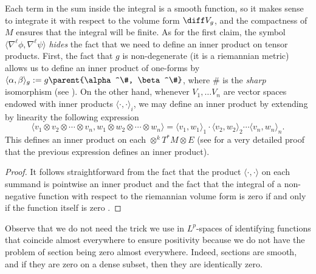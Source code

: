 \begin{obs}
    Each term in the sum inside the integral is a smooth function, so it makes sense to integrate it with respect to the volume form \(\diff V_g\), and the compactness of \(M\) ensures that the integral will be finite. As for the first claim, the symbol \(\langle \nabla^\ell \phi, \nabla^\ell\psi \rangle\) \textit{hides} the fact that we need to define an inner product on tensor products. First, the fact that \(g\) is non-degenerate (it is a riemannian metric) allows us to define an inner product of one-forms by \(\langle \alpha, \beta\rangle_g:=g\parent{\alpha^\#, \beta^\#}\), where \(\#\) is the \textit{sharp} isomorphism (see \parencite[Ch. 2]{lee_introRM}). On the other hand, whenever \(V_1, \ldots V_n\) are vector spaces endowed with inner products \(\langle\cdot, \cdot \rangle_i\), we may define an inner product by extending by linearity the following expression
    \[
    \langle v_1 \otimes v_2 \otimes \cdots \otimes v_n,  w_1 \otimes w_2 \otimes \cdots \otimes w_n \rangle = \langle v_1, w_1 \rangle_1 \cdot \langle v_2, w_2 \rangle_2 \cdots \langle v_n, w_n \rangle_n.
    \]
    This defines an inner product on each \(\otimes^k T^*M \otimes E\) (see \parencite[Lemma 1.7]{Rusman} for a very detailed proof that the previous expression defines an inner product).
\end{obs}

\begin{proof}
    It follows straightforward from the fact that the product \(\langle \cdot, \cdot \rangle\) on each summand is pointwise an inner product and the fact that the integral of a non-negative function with respect to the riemannian volume form is zero if and only if the function itself is zero \parencite[Prop. 16.28]{lee_introSM}.
\end{proof}
Observe that we do not need the trick we use in \(L^p\)-spaces of identifying functions that coincide almost everywhere to ensure positivity because we do not have the problem of section being zero almost everywhere. Indeed, sections are smooth, and if they are zero on a dense subset, then they are identically zero. \\

